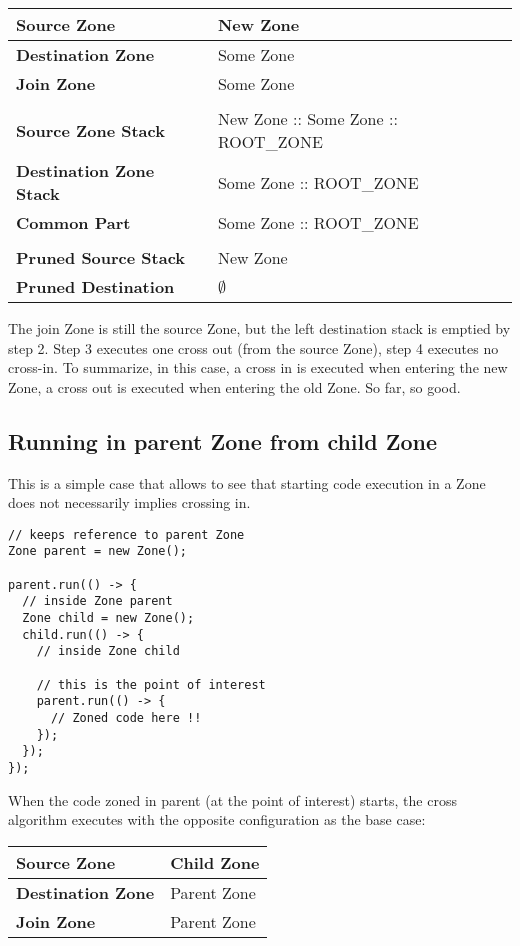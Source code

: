 \begin{tabular}{| l | l |}
\hline
\textbf{Source Zone} & New Zone
\\ \hline
\textbf{Destination Zone} & Some Zone
\\ \hline
\textbf{Join Zone} & Some Zone
\\ \hline
\multicolumn{2}{l}{}
\\ \hline
\textbf{Source Zone Stack} &  New Zone :: Some Zone :: ROOT\_ZONE
\\ \hline
\textbf{Destination Zone Stack } & Some Zone :: ROOT\_ZONE
\\ \hline
\textbf{Common Part} & Some Zone :: ROOT\_ZONE
\\ \hline
\multicolumn{2}{l}{}
\\ \hline
\textbf{Pruned Source Stack} & New Zone
\\ \hline
\textbf{Pruned Destination } & $\emptyset$
\\ \hline
\end{tabular}

The join Zone is still the source Zone, but the left destination stack is emptied by step 2. Step 3 executes one cross out (from the source Zone), step 4 executes no cross-in. To summarize, in this case, a cross in is executed when entering the new Zone, a cross out is executed when entering the old Zone. So far, so good.

\subsection*{Running in parent Zone from child Zone}

This is a simple case that allows to see that starting code execution in a Zone does not necessarily implies crossing in.

\begin{lstlisting}
// keeps reference to parent Zone
Zone parent = new Zone();

parent.run(() -> {
  // inside Zone parent
  Zone child = new Zone();
  child.run(() -> {
    // inside Zone child

    // this is the point of interest
    parent.run(() -> {
      // Zoned code here !!
    });
  });
});
\end{lstlisting}

When the code zoned in parent (at the point of interest) starts, the cross algorithm executes with the opposite configuration as the base case:

\begin{tabular}{| l | l |}
\hline
\textbf{Source Zone} & Child Zone
\\ \hline
\textbf{Destination Zone} & Parent Zone
\\ \hline
\textbf{Join Zone} & Parent Zone
\\ \hline
\end{tabular}

